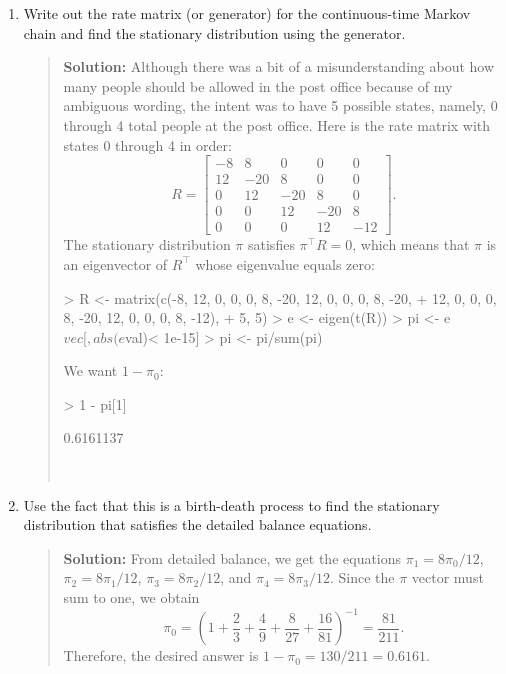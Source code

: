 \documentclass{article}
\begin{document}
\begin{enumerate}
\begin{enumerate}
\begin{enumerate}
      \item Write out the rate matrix (or generator) for the continuous-time
      Markov chain and find the stationary distribution using the generator.
      \begin{quotation}{\bf Solution:}
      Although there was a bit of a misunderstanding about how many people
      should be allowed in the post office because of my ambiguous wording, the intent
      was to have 5 possible states, namely, 0 through 4 total people at the post office.  Here
      is the rate matrix with states 0 through 4 in order:
      \[
      R = \begin{bmatrix}
      -8 & 8 & 0 & 0 & 0 \\
      12 & -20 & 8 & 0 & 0 \\
      0 & 12 & -20 & 8 & 0 \\
      0 & 0 & 12 & -20 & 8 \\
      0 & 0 & 0 & 12 & -12
      \end{bmatrix}.
      \]
      The stationary distribution $\pi$ satisfies $\pi^\top R=0$, which means that $\pi$
      is an eigenvector of $R^\top$ whose eigenvalue equals zero:
\begin{Schunk}
\begin{Sinput}
> R <- matrix(c(-8, 12, 0, 0, 0, 8, -20, 12, 0, 0, 0, 8, -20, 
+                        12, 0, 0, 0, 8, -20, 12, 0, 0, 0, 8, -12),
+          5, 5)
> e <- eigen(t(R))
> pi <- e$vec[, abs(e$val)< 1e-15]
> pi <- pi/sum(pi)
\end{Sinput}
\end{Schunk}
     We want $1-\pi_0$:
\begin{Schunk}
\begin{Sinput}
> 1 - pi[1]
\end{Sinput}
\begin{Soutput}
[1] 0.6161137
\end{Soutput}
\end{Schunk}
     \ 
      \end{quotation}
      
      \item Use the fact that this is a birth-death process to find the
      stationary distribution that satisfies the detailed balance equations.
      \begin{quotation}{\bf Solution:}
      From detailed balance, we get the equations
      $\pi_1 = 8\pi_0/12$, 
      $\pi_2 = 8\pi_1/12$, 
      $\pi_3 = 8\pi_2/12$, and 
      $\pi_4 = 8\pi_3/12$.  Since the $\pi$ vector must sum to one, we obtain
      \[
      \pi_0 = \left( 1 + \frac23 + \frac4{9} + \frac8{27} + \frac{16}{81}\right)^{-1} = \frac{81}{211}.
      \]
      Therefore, the desired answer is $1-\pi_0 = 130/211 = 0.6161$.
      \end{quotation}
      

\end{enumerate}
\end{enumerate}
\end{enumerate}
\end{document}
